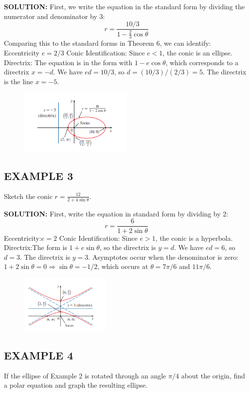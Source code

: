 \documentclass{article}
\begin{document}
\textbf{SOLUTION:}
First, we write the equation in the standard form by dividing the numerator and denominator by 3:
\[
r = \frac{10/3}{1 - \frac{2}{3} \cos\theta}
\]
Comparing this to the standard forms in Theorem 6, we can identify:\\
Eccentricity $e = 2/3$
Conic Identification: Since $e < 1$, the conic is an ellipse.
Directrix: The equation is in the form with $1 - e \cos\theta$, which corresponds to a directrix $x = -d$. We have $ed = 10/3$, so $d = (10/3) / (2/3) = 5$. The directrix is the line $x = -5$.
\begin{figure}[htbp]
    \centering
    \includegraphics[width=0.5\textwidth]{graph62.png}
\end{figure}

\subsection*{EXAMPLE 3}
Sketch the conic $r = \frac{12}{2 + 4 \sin\theta}$.

\textbf{SOLUTION:}
First, write the equation in standard form by dividing by 2:
\[
r = \frac{6}{1 + 2 \sin\theta}
\]
Eccentricity:$e = 2$
Conic Identification: Since $e > 1$, the conic is a hyperbola.
Directrix:The form is $1 + e \sin\theta$, so the directrix is $y = d$. We have $ed = 6$, so $d = 3$. The directrix is $y = 3$.
Asymptotes occur when the denominator is zero: $1 + 2 \sin\theta = 0 \Rightarrow \sin\theta = -1/2$, which occurs at $\theta = 7\pi/6$ and $11\pi/6$.
\begin{figure}[htbp]
    \centering
    \includegraphics[width=0.4\textwidth]{graph63.png}
\end{figure}

\subsection*{EXAMPLE 4}
If the ellipse of Example 2 is rotated through an angle $\pi/4$ about the origin, find a polar equation and graph the resulting ellipse.
\end{document}
